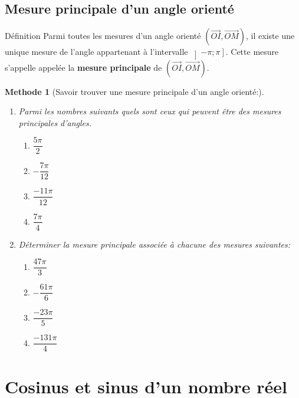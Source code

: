 \documentclass[10pt,a4paper]{article}
\newcommand{\VE}[1]{\overrightarrow{#1}}
\theoremstyle{break}
\newtheorem{Meth}{Methode}
\begin{document}
		\subsection{Mesure principale d'un angle orienté}
			\begin{bclogo}[couleur = yellow!30, arrondi = 0.1,logo=\bcbook]{Définition}
			Parmi toutes les mesures d'un angle orienté $(\VE{OI}, \VE{OM})$, il existe une unique mesure de l'angle appartenant à l'intervalle $\left] -\pi;\pi\right] $. Cette mesure s'appelle  appelée la \textbf{mesure principale} de $(\VE{OI}, \VE{OM})$.
		\end{bclogo}
		\begin{Meth}[Savoir trouver une mesure principale d'un angle orienté:]
			\begin{enumerate}
				\item Parmi les nombres suivants quels sont ceux qui peuvent être des mesures principales d'angles.
				\begin{multicols}{4}
					\begin{enumerate}
						\item $\dfrac{5\pi}{2}$
						\item $-\dfrac{7\pi}{12}$
						\item $\dfrac{-11\pi}{12}$
						\item $\dfrac{7\pi}{4}$
					\end{enumerate}
				\end{multicols}
				\item Déterminer la mesure principale associée à chacune des mesures suivantes:
				\begin{multicols}{4}
					\begin{enumerate}
						\item $\dfrac{47\pi}{3}$
						\item $-\dfrac{61\pi}{6}$
						\item $\dfrac{-23\pi}{5}$
						\item $\dfrac{-131\pi}{4}$
					\end{enumerate}
				\end{multicols}
			\end{enumerate}
		\end{Meth}
	
		\section{Cosinus et sinus d'un nombre réel}
\end{document}

